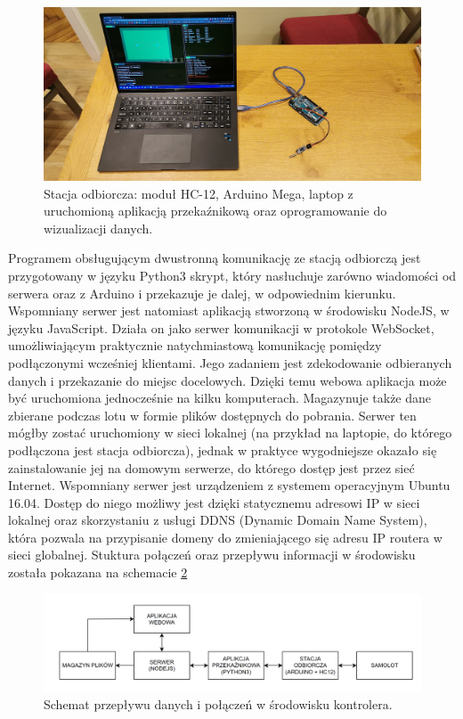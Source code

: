\documentclass[12pt, a4paper]{article}
\begin{document}
 \begin{figure}[ht]
    \centering
    \includegraphics[width=1\textwidth]{baza}
    \caption{Stacja odbiorcza: moduł HC-12, Arduino Mega, laptop z uruchomioną aplikacją przekaźnikową oraz oprogramowanie do wizualizacji danych.}
    \label{fig:baza}
\end{figure}

Programem obsługującym dwustronną komunikację ze stacją odbiorczą jest przygotowany w języku Python3 skrypt, który nasłuchuje zarówno wiadomości od serwera oraz z Arduino i przekazuje je dalej, w odpowiednim kierunku. Wspomniany serwer jest natomiast aplikacją stworzoną w środowisku NodeJS, w języku JavaScript. Działa on jako serwer komunikacji w protokole WebSocket, umożliwiającym praktycznie natychmiastową komunikację pomiędzy podłączonymi wcześniej klientami. Jego zadaniem jest zdekodowanie odbieranych danych i przekazanie do miejsc docelowych. Dzięki temu webowa aplikacja może być uruchomiona jednocześnie na kilku komputerach. Magazynuje także dane zbierane podczas lotu w formie plików dostępnych do pobrania. Serwer ten mógłby zostać uruchomiony w sieci lokalnej (na przykład na laptopie, do którego podłączona jest stacja odbiorcza), jednak w praktyce wygodniejsze okazało się zainstalowanie jej na domowym serwerze, do którego dostęp jest przez sieć Internet. Wspomniany serwer jest urządzeniem z systemem operacyjnym Ubuntu 16.04. Dostęp do niego możliwy jest dzięki statycznemu adresowi IP w sieci lokalnej oraz skorzystaniu z usługi DDNS (Dynamic Domain Name System), która pozwala na przypisanie domeny do zmieniającego się adresu IP routera w sieci globalnej. Stuktura połączeń oraz przepływu informacji w środowisku została pokazana na schemacie \ref{fig:env}

 \begin{figure}[ht]
    \centering
    \includegraphics[width=1\textwidth]{diagram_env}
    \caption{Schemat przepływu danych i połączeń w środowisku kontrolera.}
    \label{fig:env}
\end{figure}
\end{document}
